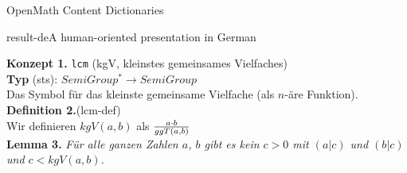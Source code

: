 \begin{tchapter}[id=omcds]{OpenMath Content Dictionaries}
\begin{myfig}{result-de}{A human-oriented presentation in German}
{\begin{minipage}{11cm}
{\bf Konzept 1.} {\tt{lcm}} (kgV, kleinstes gemeinsames Vielfaches) \\
 {\bf Typ} (sts): $SemiGroup^* \rightarrow SemiGroup$\\
  Das Symbol f\"ur das kleinste gemeinsame Vielfache (als $n$-\"are Funktion).\\[1ex]
{\bf Definition 2.}(lcm-def)\\
  Wir definieren $kgV (a,b)$ als $a\cdot b\over  ggT (a,b)$\\[1ex]
{\bf Lemma 3.} {\emph{F\"ur alle ganzen Zahlen $a$, $b$ gibt es kein $c> 0$ mit
 $(a|c)$ und $(b|c)$ und $c< kgV(a,b)$.}}
  \end{minipage}}
\end{myfig}
\end{tchapter}


